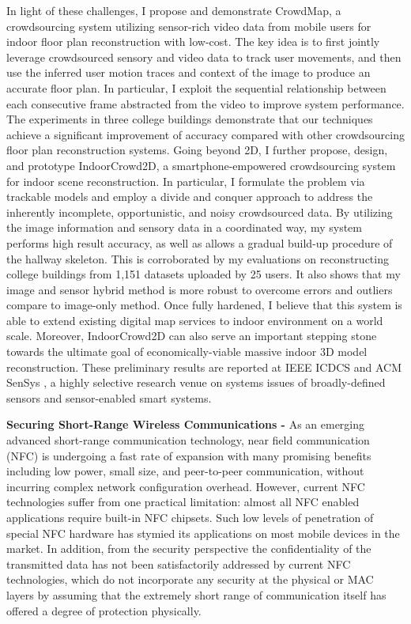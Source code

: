 \documentclass[11pt]{article}
\begin{document}
In light of these challenges, I propose and demonstrate CrowdMap, a crowdsourcing system utilizing sensor-rich video data from mobile users for indoor floor plan reconstruction with low-cost. The key idea is to first jointly leverage crowdsourced sensory and video data to track user movements, and then use the inferred user motion traces and context of the image to produce an accurate floor plan. In particular, I exploit the sequential relationship between each consecutive frame abstracted from the video to improve system performance. The experiments in three college buildings demonstrate that our techniques achieve a significant improvement of accuracy compared with other crowdsourcing floor plan reconstruction systems. Going beyond 2D, I further propose, design, and prototype IndoorCrowd2D, a smartphone-empowered crowdsourcing system for indoor scene reconstruction. In particular, I formulate the problem via trackable models and employ a divide and conquer approach to address the inherently incomplete, opportunistic, and noisy crowdsourced data. By utilizing the image information and sensory data in a coordinated way, my system performs high result accuracy, as well as allows a gradual build-up procedure of the hallway skeleton. This is corroborated by my evaluations on reconstructing college buildings from 1,151 datasets uploaded by 25 users. It also shows that my image and sensor hybrid method is more robust to overcome errors and outliers compare to image-only method. Once fully hardened, I believe that this system is able to extend existing digital map services to indoor environment on a world scale. Moreover, IndoorCrowd2D can also serve an important stepping stone towards the ultimate goal of economically-viable massive indoor 3D model reconstruction. These preliminary results are reported at IEEE ICDCS \cite{ICDCS15} and ACM SenSys \cite{Sensys15}, a highly selective research venue on systems issues of broadly-defined sensors and sensor-enabled smart systems. 

\textbf{Securing Short-Range Wireless Communications -} As an emerging advanced short-range communication technology, near field communication (NFC) is undergoing a fast rate of expansion with many promising benefits including low power, small size, and peer-to-peer communication, without incurring complex network configuration overhead. However, current NFC technologies suffer from one practical limitation: almost all NFC enabled applications require built-in NFC chipsets. Such low levels of penetration of special NFC hardware has stymied its applications on most mobile devices in the market. In addition, from the security perspective the confidentiality of the transmitted data has not been satisfactorily addressed by current NFC technologies, which do not incorporate any security at the physical or MAC layers by assuming that the extremely short range of communication itself has offered a degree of protection physically. 
\end{document}

